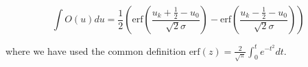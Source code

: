 \documentclass{article}
\begin{document}
\begin{equation}
\int O(u)du = \frac{1}{2}\left(\mathrm{erf}\left(\frac{u_{k}+\frac{1}{2}-u_{0}}{\sqrt{2}\sigma}\right) -\mathrm{erf}\left(\frac{u_{k}-\frac{1}{2}-u_{0}}{\sqrt{2}\sigma}\right)\right)
\end{equation}

where we have used the common definition $\mathrm{erf}(z) = \frac{2}{\sqrt{\pi}}\int_{0}^{t}e^{-t^{2}}dt$. 
\end{document}
